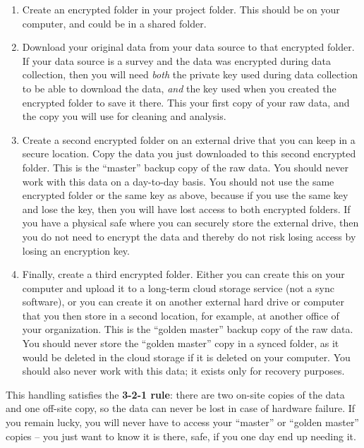 \begin{enumerate}
	\item Create an encrypted folder in your project folder.
	This should be on your computer, and could be in a shared folder.

	\item Download your original data from your data source to that encrypted folder.
	If your data source is a survey and the data was encrypted during data collection,
	then you will need \textit{both} the
	private key used during data collection to be able to download the data,
	\textit{and} the key used when you created the encrypted folder to save it there.
	This your first copy of your raw data, and the copy you will use for cleaning and analysis.

	\item Create a second encrypted folder on an external drive that you can keep in a secure location.
	Copy the data you just downloaded to this second encrypted folder.
	This is the ``master'' backup copy of the raw data.
	You should never work with this data on a day-to-day basis.
	You should not use the same encrypted folder or the same key as above,
	because if you use the same key and lose the key,
	then you will have lost access to both encrypted folders.
	If you have a physical safe where you can securely store the external drive,
	then you do not need to encrypt the data
	and thereby do not risk losing access by losing an encryption key.

	\item Finally, create a third encrypted folder.
	Either you can create this on your computer and upload it to a long-term cloud storage service (not a sync software),
	or you can create it on	another external hard drive or computer that you then store in a second location,
	for example, at another office of your organization.
	This is the ``golden master'' backup copy of the raw data.
	You should never store the ``golden master'' copy in a synced folder,
	as it would be deleted in the cloud storage if it is deleted on your computer.
	You should also never work with this data;
	it exists only for recovery purposes.
\end{enumerate}

\noindent This handling satisfies the \textbf{3-2-1 rule}:
there are two on-site copies of the data and one off-site copy,
so the data can never be lost in case of hardware failure.
If you remain lucky, you will never have to access your ``master'' or ``golden master'' copies --
you just want to know it is there, safe, if you one day end up needing it.

